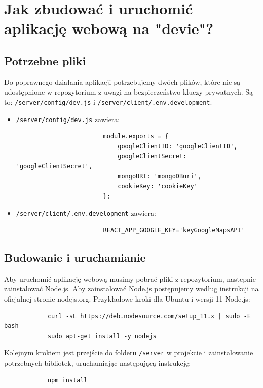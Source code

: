 \documentclass{sprawozdanie-agh}
\begin{document}
   


	\stronatytulowa{}

	

	\section{Jak zbudować i uruchomić aplikację webową na "devie"?}

		\subsection{Potrzebne pliki}

			Do poprawnego działania aplikacji potrzebujemy dwóch plików, które nie są udostępnione w repozytorium z uwagi na bezpieczeństwo kluczy prywatnych.
			Są to: \lstinline{/server/config/dev.js} i \lstinline{/server/client/.env.development}.
			 \begin{itemize}
				 \item \lstinline{/server/config/dev.js} zawiera: 
					\begin{lstlisting}
						module.exports = {
							googleClientID: 'googleClientID',
							googleClientSecret: 'googleClientSecret',
							mongoURI: 'mongoDBuri',
							cookieKey: 'cookieKey'
						};
					\end{lstlisting}
				\item \lstinline{/server/client/.env.development} zawiera:
					\begin{lstlisting}
						REACT_APP_GOOGLE_KEY='keyGoogleMapsAPI'
					\end{lstlisting}
			 \end{itemize}

		\subsection{Budowanie i uruchamianie}

		Aby uruchomić aplikację webową musimy pobrać pliki z repozytorium,
		nastepnie zainstalować Node.js. Aby zainstalować Node.js postępujemy według instrukcji na oficjalnej stronie nodejs.org. Przykładowe kroki dla Ubuntu i wersji 11 Node.js:

		\begin{lstlisting}
			curl -sL https://deb.nodesource.com/setup_11.x | sudo -E bash -
			sudo apt-get install -y nodejs
		\end{lstlisting}
		Kolejnym krokiem jest przejście do folderu \lstinline{/server} w projekcie i zainstalowanie potrzebnych bibliotek, uruchamiając następującą instrukcję:
		\begin{lstlisting}
			npm install
		\end{lstlisting}
\end{document}
